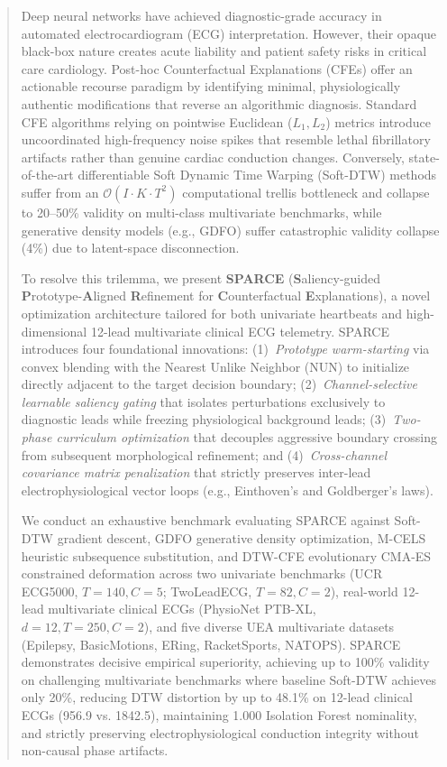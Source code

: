 \documentclass[conference]{IEEEtran}
\begin{document}
\begin{abstract}
Deep neural networks have achieved diagnostic-grade accuracy in automated electrocardiogram (ECG) interpretation. However, their opaque black-box nature creates acute liability and patient safety risks in critical care cardiology. Post-hoc Counterfactual Explanations (CFEs) offer an actionable recourse paradigm by identifying minimal, physiologically authentic modifications that reverse an algorithmic diagnosis. Standard CFE algorithms relying on pointwise Euclidean ($L_1, L_2$) metrics introduce uncoordinated high-frequency noise spikes that resemble lethal fibrillatory artifacts rather than genuine cardiac conduction changes. Conversely, state-of-the-art differentiable Soft Dynamic Time Warping (Soft-DTW) methods suffer from an $\mathcal{O}(I \cdot K \cdot T^2)$ computational trellis bottleneck and collapse to 20--50\% validity on multi-class multivariate benchmarks, while generative density models (e.g., GDFO) suffer catastrophic validity collapse (4\%) due to latent-space disconnection.

To resolve this trilemma, we present \textbf{SPARCE} (\textbf{S}aliency-guided \textbf{P}rototype-\textbf{A}ligned \textbf{R}efinement for \textbf{C}ounterfactual \textbf{E}xplanations), a novel optimization architecture tailored for both univariate heartbeats and high-dimensional 12-lead multivariate clinical ECG telemetry. SPARCE introduces four foundational innovations: (1)~\textit{Prototype warm-starting} via convex blending with the Nearest Unlike Neighbor ($\text{NUN}$) to initialize directly adjacent to the target decision boundary; (2)~\textit{Channel-selective learnable saliency gating} that isolates perturbations exclusively to diagnostic leads while freezing physiological background leads; (3)~\textit{Two-phase curriculum optimization} that decouples aggressive boundary crossing from subsequent morphological refinement; and (4)~\textit{Cross-channel covariance matrix penalization} that strictly preserves inter-lead electrophysiological vector loops (e.g., Einthoven's and Goldberger's laws). 

We conduct an exhaustive benchmark evaluating SPARCE against Soft-DTW gradient descent, GDFO generative density optimization, M-CELS heuristic subsequence substitution, and DTW-CFE evolutionary CMA-ES constrained deformation across two univariate benchmarks (UCR ECG5000, $T=140, C=5$; TwoLeadECG, $T=82, C=2$), real-world 12-lead multivariate clinical ECGs (PhysioNet PTB-XL, $d=12, T=250, C=2$), and five diverse UEA multivariate datasets (Epilepsy, BasicMotions, ERing, RacketSports, NATOPS). SPARCE demonstrates decisive empirical superiority, achieving up to 100\% validity on challenging multivariate benchmarks where baseline Soft-DTW achieves only 20\%, reducing DTW distortion by up to 48.1\% on 12-lead clinical ECGs (956.9 vs. 1842.5), maintaining 1.000 Isolation Forest nominality, and strictly preserving electrophysiological conduction integrity without non-causal phase artifacts.
\end{abstract}
\end{document}
